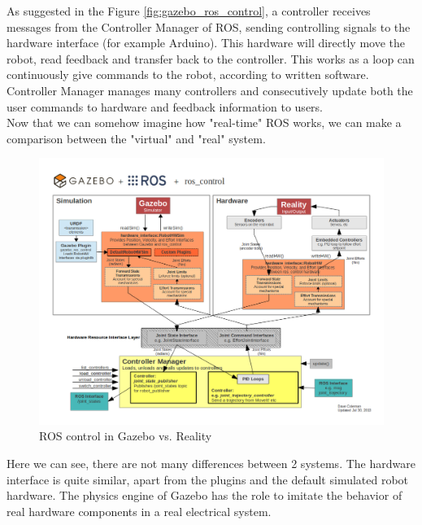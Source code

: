 \documentclass[pdftex,12pt,a4paper]{article}
\begin{document}
  \newpage
  As suggested in the Figure \ref{fig:gazebo_ros_control}, a controller receives messages from the Controller Manager of ROS, sending controlling signals to the hardware interface (for example Arduino). This hardware will directly move the robot, read feedback and transfer back to the controller. This works as a loop can continuously give commands to the robot, according to written software.\\
  Controller Manager manages many controllers and consecutively update both the user commands to hardware and feedback information to users.\\
  Now that we can somehow imagine how "real-time" ROS works, we can make a comparison between the "virtual" and "real" system.
  \begin{figure}[h]
      \centering
      \includegraphics[width=0.9\linewidth]{image/Gazebo_ros_transmission.png}
      \caption{ROS control in Gazebo vs. Reality}
      \label{fig:gazebo_ros_transmission}
  \end{figure}
  Here we can see, there are not many differences between 2 systems. The hardware interface is quite similar, apart from the plugins and the default simulated robot hardware. The physics engine of Gazebo has the role to imitate the behavior of real hardware components in a real electrical system.
  
  \newpage
\end{document}
